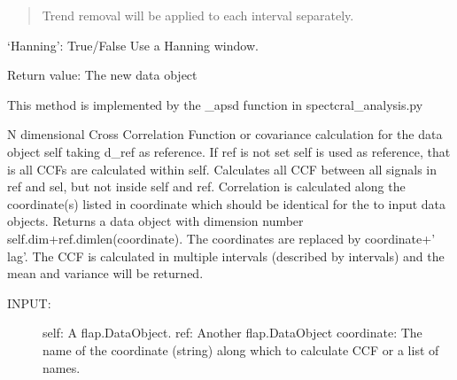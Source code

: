 \documentclass[letterpaper,10pt,english]{sphinxmanual}
\begin{document}
\begin{fulllineitems}
\begin{fulllineitems}
\begin{description}
\begin{description}
\begin{description}
\begin{quote}
Trend removal will be applied to each interval separately.
\end{quote}

‘Hanning’: True/False Use a Hanning window.

\end{description}

\end{description}

\end{description}

Return value: The new data object

This method is implemented by the \_apsd function in spectcral\_analysis.py

\end{fulllineitems}


\begin{fulllineitems}
\label{\detokenize{data_object:flap.data_object.DataObject.ccf}}
N dimensional Cross Correlation Function or covariance calculation for the data object self taking d\_ref
as reference. If ref is not set self is used as reference, that is all CCFs are calculated
within self. Calculates all CCF between all signals in ref and sel, but not inside self and ref.
Correlation is calculated along the coordinate(s) listed in coordinate which should be
identical for the to input data objects.
Returns a data object with dimension number self.dim+ref.dim\sphinxhyphen{}len(coordinate).
The coordinates are replaced by coordinate+’ lag’.
The CCF is calculated in multiple intervals (described by intervals)
and the mean and variance will be returned.
\begin{description}
\item[{INPUT:}] \leavevmode
self: A flap.DataObject.
ref: Another flap.DataObject
coordinate: The name of the coordinate (string) along which to calculate CCF or a list of names.
\begin{quote}


\end{quote}
\end{description}
\end{fulllineitems}
\end{fulllineitems}
\end{document}
